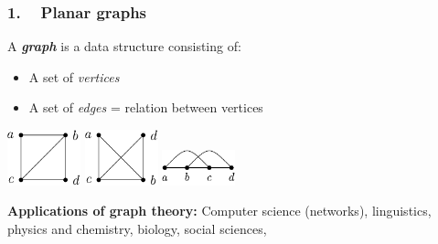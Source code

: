 

\begin{frame}
\frametitle{1. ~ Planar graphs}


A \emph{\bfseries graph} is a data structure consisting of:
\begin{itemize}[$\bullet$]
 \item A set of \emph{vertices}
 \item A set of \emph{edges} = relation between vertices
\end{itemize}


\bigskip \bigskip \pause
\begin{center}
\includegraphics[width=60pt]{image-78.pdf} \hspace{30pt}
\includegraphics[width=60pt]{image-79.pdf} \hspace{30pt}
\includegraphics[width=60pt]{image-80.pdf}
\end{center}

\bigskip \bigskip
\pause
{\bfseries Applications of graph theory:} 
Computer science (networks), linguistics, physics and chemistry, biology, social sciences, \etc{}


\end{frame}



